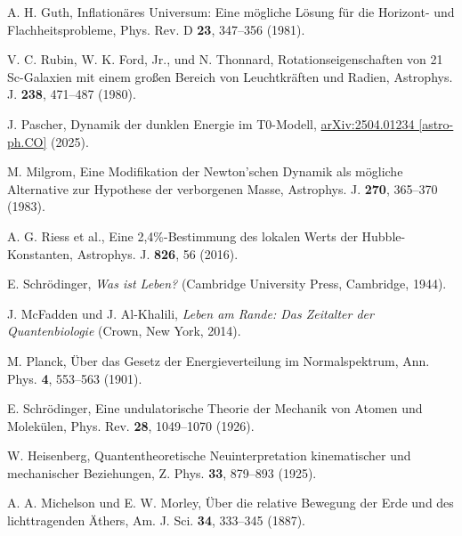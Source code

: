 \documentclass[twocolumn,aps,prl]{revtex4-2}
\begin{document}
{{{{{{{{{{{{{{{{\begin{thebibliography}{99}
																				 A. H. Guth, Inflationäres Universum: Eine mögliche Lösung für die Horizont- und Flachheitsprobleme, Phys. Rev. D \textbf{23}, 347--356 (1981).
																				
																				 V. C. Rubin, W. K. Ford, Jr., und N. Thonnard, Rotationseigenschaften von 21 Sc-Galaxien mit einem großen Bereich von Leuchtkräften und Radien, Astrophys. J. \textbf{238}, 471--487 (1980).
																				
																				 J. Pascher, Dynamik der dunklen Energie im T0-Modell, \href{https://github.com/jpascher/T0-Time-Mass-Duality/tree/main/2/pdf/Deutsch/DunkleEnergieT0.pdf}{arXiv:2504.01234 [astro-ph.CO]} (2025).
																				
																				 M. Milgrom, Eine Modifikation der Newton’schen Dynamik als mögliche Alternative zur Hypothese der verborgenen Masse, Astrophys. J. \textbf{270}, 365--370 (1983).
																				
																				 A. G. Riess et al., Eine 2,4\%-Bestimmung des lokalen Werts der Hubble-Konstanten, Astrophys. J. \textbf{826}, 56 (2016).
																				
																				 E. Schrödinger, \textit{Was ist Leben?} (Cambridge University Press, Cambridge, 1944).
																				
																				 J. McFadden und J. Al-Khalili, \textit{Leben am Rande: Das Zeitalter der Quantenbiologie} (Crown, New York, 2014).
																				
																				 M. Planck, Über das Gesetz der Energieverteilung im Normalspektrum, Ann. Phys. \textbf{4}, 553--563 (1901).
																				
																				 E. Schrödinger, Eine undulatorische Theorie der Mechanik von Atomen und Molekülen, Phys. Rev. \textbf{28}, 1049--1070 (1926).
																				
																				 W. Heisenberg, Quantentheoretische Neuinterpretation kinematischer und mechanischer Beziehungen, Z. Phys. \textbf{33}, 879--893 (1925).
																				
																				 A. A. Michelson und E. W. Morley, Über die relative Bewegung der Erde und des lichttragenden Äthers, Am. J. Sci. \textbf{34}, 333--345 (1887).
																				

\end{thebibliography}}}}}}}}}}}}}}}}}
\end{document}
